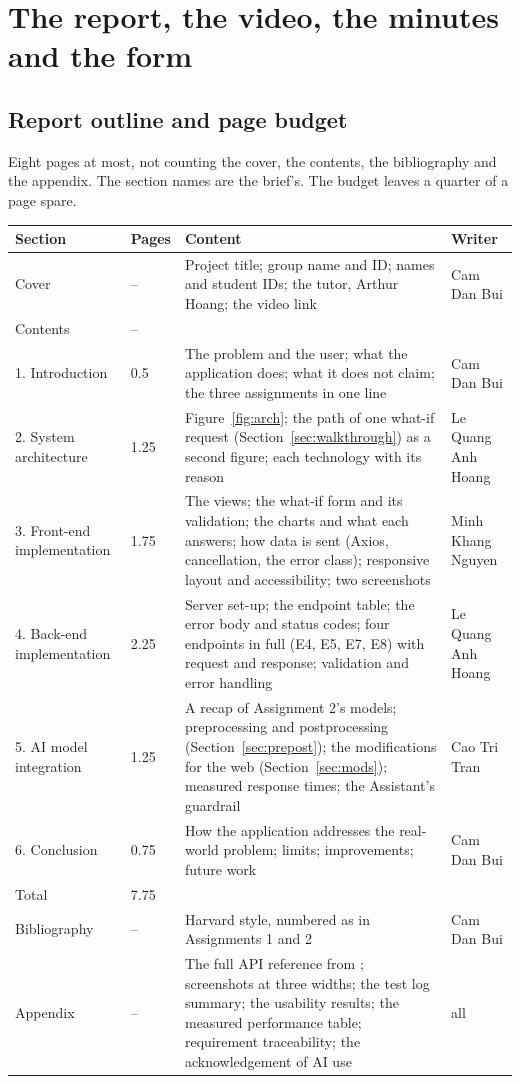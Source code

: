 \section{The report, the video, the minutes and the form}
\label{sec:report}

\subsection{Report outline and page budget}
\label{sec:reportoutline}

Eight pages at most, not counting the cover, the contents, the bibliography and the appendix. The
section names are the brief's. The budget leaves a quarter of a page spare.

{\small
\begin{longtable}{@{}L{3.3cm}C{1.1cm}L{7.0cm}L{2.6cm}@{}}
\toprule
\textbf{Section} & \textbf{Pages} & \textbf{Content} & \textbf{Writer} \\
\midrule
\endhead
Cover & -- & Project title; group name and ID; names and student IDs; the tutor, Arthur Hoang; the video link & Cam Dan Bui \\
Contents & -- & & \\
1. Introduction & 0.5 & The problem and the user; what the application does; what it does not claim; the three assignments in one line & Cam Dan Bui \\
2. System architecture & 1.25 & Figure~\ref{fig:arch}; the path of one what-if request (Section~\ref{sec:walkthrough}) as a second figure; each technology with its reason & Le Quang Anh Hoang \\
3. Front-end implementation & 1.75 & The views; the what-if form and its validation; the charts and what each answers; how data is sent (Axios, cancellation, the error class); responsive layout and accessibility; two screenshots & Minh Khang Nguyen \\
4. Back-end implementation & 2.25 & Server set-up; the endpoint table; the error body and status codes; four endpoints in full (E4, E5, E7, E8) with request and response; validation and error handling & Le Quang Anh Hoang \\
5. AI model integration & 1.25 & A recap of Assignment 2's models; preprocessing and postprocessing (Section~\ref{sec:prepost}); the modifications for the web (Section~\ref{sec:mods}); measured response times; the Assistant's guardrail & Cao Tri Tran \\
6. Conclusion & 0.75 & How the application addresses the real-world problem; limits; improvements; future work & Cam Dan Bui \\
\midrule
Total & 7.75 & & \\
\midrule
Bibliography & -- & Harvard style, numbered as in Assignments 1 and 2 & Cam Dan Bui \\
Appendix & -- & The full API reference from ; screenshots at three widths; the test log summary; the usability results; the measured performance table; requirement traceability; the acknowledgement of AI use & all \\
\bottomrule
\end{longtable}
}


